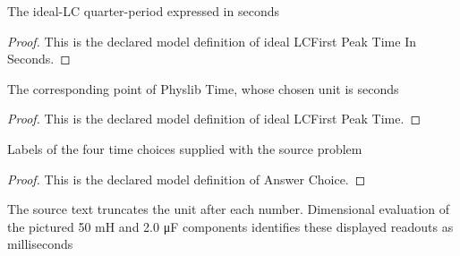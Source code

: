 \begin{definition}
  \label{def:physics:phyx-mini-0934:phyxminiproblems-problemphyxmini0934-ideallcfirstpeaktimeinseconds}
  The ideal-LC quarter-period expressed in seconds
\end{definition}
\begin{proof}
  This is the declared model definition of ideal LCFirst Peak Time In Seconds.
\end{proof}
\begin{definition}
  \label{def:physics:phyx-mini-0934:phyxminiproblems-problemphyxmini0934-ideallcfirstpeaktime}
  The corresponding point of Physlib Time, whose chosen unit is seconds
\end{definition}
\begin{proof}
  This is the declared model definition of ideal LCFirst Peak Time.
\end{proof}
\begin{definition}
  \label{def:physics:phyx-mini-0934:phyxminiproblems-problemphyxmini0934-answerchoice}
  Labels of the four time choices supplied with the source problem
\end{definition}
\begin{proof}
  This is the declared model definition of Answer Choice.
\end{proof}
\begin{definition}
  \label{def:physics:phyx-mini-0934:phyxminiproblems-problemphyxmini0934-answerchoice-displayedtimeinmilliseconds}
  The source text truncates the unit after each number. Dimensional evaluation of the pictured 50 mH and 2.0 μF components identifies these displayed readouts as milliseconds
\end{definition}
